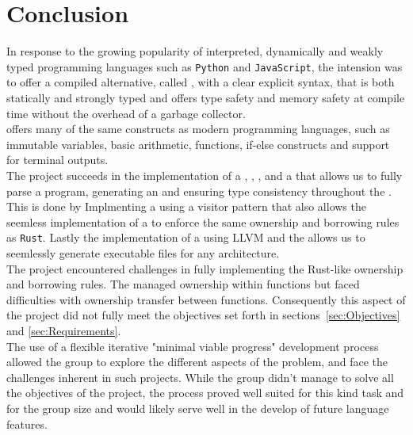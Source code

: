 \section{Conclusion}
\label{sec:conclusion}

In response to the growing popularity of interpreted, dynamically and weakly typed programming
languages such as \texttt{Python} and \texttt{JavaScript}, the intension was to offer
a compiled alternative, called \lang, with a clear explicit syntax, that is both statically and strongly
typed and offers type safety and memory safety at compile time without the overhead
of a garbage collector. \\ 

\lang{} offers many of the same constructs as modern programming languages,
such as immutable variables, basic arithmetic, functions, if-else constructs and
support for terminal outputs. \\

The project succeeds in the implementation of a \lexer{}, \parser{}, 
\typeChecker{}, and a \codeGen{} that allows us to fully parse a \lang{} program,
generating an \ast{} and ensuring type consistency throughout the \ast{}. This is
done by
Implmenting a \typeChecker{} using a visitor pattern that also allows the seemless
implementation of a \borrowChecker{} to enforce the same ownership and borrowing
rules as \texttt{Rust}. Lastly the implementation of a \codeGen{} using LLVM and the
\gcc{} allows us to seemlessly generate executable
files for any architecture. \\

The project encountered challenges in fully implementing the Rust-like
ownership and borrowing rules.
The \borrowChecker{} managed ownership within functions but faced difficulties with
ownership transfer between functions. Consequently this aspect of the project did
not fully meet the objectives set forth in sections~\ref{sec:Objectives} and
\ref{sec:Requirements}. \\

The use of a flexible iterative "minimal viable progress" development process allowed
the group to explore the different aspects of the problem, and face the challenges
inherent in such projects. While the group didn't manage to solve all the objectives
of the project, the process proved well suited for this kind task and for the group
size and would likely serve well in the develop of future language features.

\newpage
